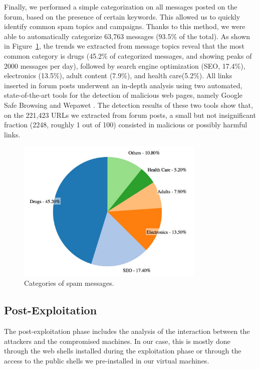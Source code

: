 Finally, we performed a simple categorization on all messages posted on the forum, based on the presence of certain keywords. This allowed us to quickly identify common spam topics and campaigns. Thanks to this method, we were able to automatically categorize 63,763 messages (93.5\% of the total).
As shown in Figure~\ref{fig:SpamCategory}, the trends we extracted from message topics reveal that the most common category is drugs (45.2\% of categorized messages, and showing peaks of 2000 messages per day), followed by search engine optimization (SEO, 17.4\%), electronics (13.5\%), adult content (7.9\%), and health care(5.2\%).
All links inserted in forum posts underwent an in-depth analysis using two automated, state-of-the-art tools for the detection of malicious web pages, namely Google Safe Browsing \cite{googleSafeBrowsing} and Wepawet \cite{wepaWet}. The detection results of these two tools show that, on the 221,423 URLs we extracted from forum posts, a small but not insignificant fraction (2248, roughly 1 out of 100) consisted in malicious or possibly harmful links.

\begin{figure}[tbh]
\centerline{\includegraphics[width=0.8\textwidth]{Images/SpamCategory.jpg}}
\caption{Categories of spam messages.\label{fig:SpamCategory}}
\end{figure}

\subsection{Post-Exploitation}

The post-exploitation phase includes the analysis of the interaction between the attackers and the compromised machines. In our case, this is mostly done through the web shells installed during the exploitation phase or through the access to the public shells we pre-installed in our virtual machines.

